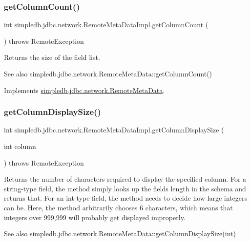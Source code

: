 \subsubsection{\texorpdfstring{get\+Column\+Count()}{getColumnCount()}}
{\footnotesize\ttfamily int simpledb.\+jdbc.\+network.\+Remote\+Meta\+Data\+Impl.\+get\+Column\+Count (\begin{DoxyParamCaption}{ }\end{DoxyParamCaption}) throws Remote\+Exception\hspace{0.3cm}{\ttfamily [inline]}}

Returns the size of the field list. \begin{DoxySeeAlso}{See also}
simpledb.\+jdbc.\+network.\+Remote\+Meta\+Data\+::get\+Column\+Count() 
\end{DoxySeeAlso}


Implements \hyperlink{interfacesimpledb_1_1jdbc_1_1network_1_1RemoteMetaData}{simpledb.\+jdbc.\+network.\+Remote\+Meta\+Data}.

\mbox{\label{classsimpledb_1_1jdbc_1_1network_1_1RemoteMetaDataImpl_a0706aa74aa84aa1823062b6c7375d6c3}} 
\subsubsection{\texorpdfstring{get\+Column\+Display\+Size()}{getColumnDisplaySize()}}
{\footnotesize\ttfamily int simpledb.\+jdbc.\+network.\+Remote\+Meta\+Data\+Impl.\+get\+Column\+Display\+Size (\begin{DoxyParamCaption}\item[{int}]{column }\end{DoxyParamCaption}) throws Remote\+Exception\hspace{0.3cm}{\ttfamily [inline]}}

Returns the number of characters required to display the specified column. For a string-\/type field, the method simply looks up the field\textquotesingle{}s length in the schema and returns that. For an int-\/type field, the method needs to decide how large integers can be. Here, the method arbitrarily chooses 6 characters, which means that integers over 999,999 will probably get displayed improperly. \begin{DoxySeeAlso}{See also}
simpledb.\+jdbc.\+network.\+Remote\+Meta\+Data\+::get\+Column\+Display\+Size(int) 
\end{DoxySeeAlso}


